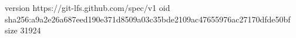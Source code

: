 version https://git-lfs.github.com/spec/v1
oid sha256:a9a2e26a687eed190e371d8509a03c35bde2109ac47655976ac27170dfde50bf
size 31924
